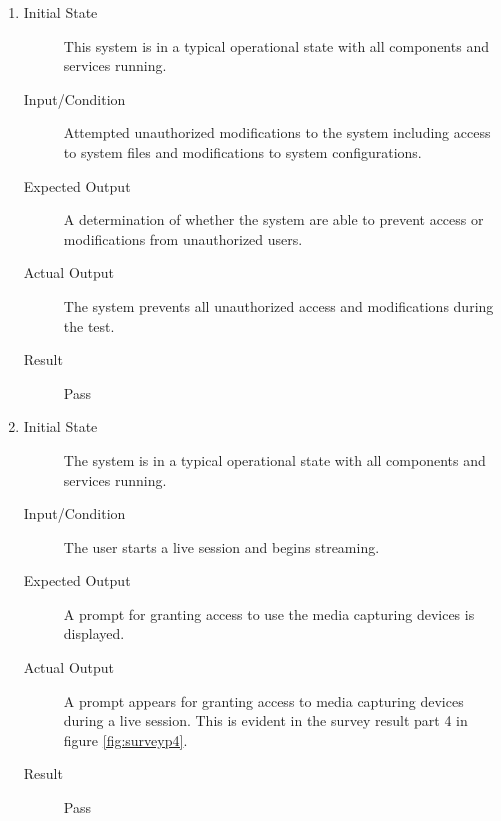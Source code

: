 \documentclass[12pt, titlepage]{article}
\begin{document}
\begin{enumerate}[NFR-T1]
  \item \label{NFRT23}
    \begin{description}
    \item[Initial State] This system is in a typical operational state with all
      components and services running.
    \item[Input/Condition] Attempted unauthorized modifications to the system
      including access to system files and modifications to system
      configurations.
    \item[Expected Output] A determination of whether the system are able to
      prevent access or modifications from unauthorized users.
    \item[Actual Output] The system prevents all unauthorized access and
      modifications during the test.
    \item[Result] Pass
    \end{description}
  \item \label{NFRT24}
    \begin{description}
    \item[Initial State] The system is in a typical operational state with all
      components and services running.
    \item[Input/Condition] The user starts a live session and begins streaming.
    \item[Expected Output] A prompt for granting access to use the media capturing
      devices is displayed.
    \item[Actual Output] A prompt appears for granting access to media capturing
      devices during a live session. This is evident in the survey result
      part 4 in figure \ref{fig:surveyp4}.
    \item[Result] Pass \\

\end{description}
\end{enumerate}
\end{document}
